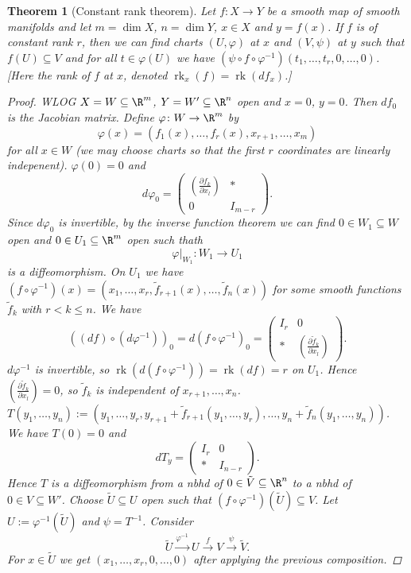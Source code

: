\documentclass[A4paper, british]{amsart}
\theoremstyle{darkgreentheorem}
\newtheorem{thm}{Theorem}[section]
\theoremstyle{darkbluedefinition}
\theoremstyle{darkredexample}
\theoremstyle{remark}
\DeclareMathOperator{\rk}{rk}
\newcommand{\1}{\mathbbm{1}}
\newcommand{\sub}{\subseteq}
\begin{document}
\begin{thm}[Constant rank theorem]
    Let $f\colon X\to Y$ be a smooth map of smooth manifolds and let $m=\dim{X}$, $n=\dim{Y}$, $x\in X$ and $y=f(x)$.
    If $f$ is of constant rank $r$, then we can find charts $(U,\varphi)$ at $x$ and $(V,\psi)$ at $y$ such that $f(U)\sub V$ and for all $t\in \varphi(U)$ we have $(\psi \circ f\circ \varphi^{-1})(t_{1},\ldots,t_{r},0,\ldots,0)$.
    [Here the rank of $f$ at $x$, denoted $\rk_{x}(f)=\rk(df_{x})$.]
    \begin{proof}
	WLOG $X=W\sub \R^{m}$, $Y=W'\sub \R^{n}$ open and $x=0$, $y=0$.
	Then $df_{0}$ is the Jacobian matrix.
	Define $\varphi \colon W\to \R^{m}$ by
	\[ \varphi(x)=(f_{1}(x),\ldots,f_{r}(x),x_{r+1},\ldots,x_{m}) \]
	for all $x\in W$ (we may choose charts so that the first $r$ coordinates are linearly indepenent).
	$\varphi(0)=0$ and
	\[ d\varphi_{0}=\begin{pmatrix} \left(\frac{\partial f_{k}}{\partial x_{l}}\right) & * \\ 0 & I_{m-r} \end{pmatrix}. \]
	    Since $d\varphi_{0}$ is invertible, by the inverse function theorem we can find $0\in W_{1}\sub W$ open and $0\in U_{1}\sub \R^{m}$ open such thath
	\[ \varphi|_{W_{1}}\colon W_{1}\to U_{1} \]
	is a diffeomorphism.
	On $U_{1}$ we have $(f\circ \varphi^{-1})(x)=(x_{1},\ldots,x_{r},\tilde{f}_{r+1}(x),\ldots,\tilde{f}_{n}(x))$ for some smooth functions $\tilde{f}_{k}$ with $r<k\leqslant n$.
	We have
	\[ ((df)\circ (d\varphi^{-1}))_{0}=d(f\circ \varphi^{-1})_{0}=\begin{pmatrix} I_{r} & 0 \\ * & \left( \frac{\partial \tilde{f}_{k}}{\partial x_{l}}\right) \end{pmatrix}.\]
	$d\varphi^{-1}$ is invertible, so $\rk(d(f\circ \varphi^{-1}))=\rk(df)=r$ on $U_{1}$.
	Hence $\left(\frac{\partial \tilde{f}_{k}}{\partial x_{l}}\right) = 0 $, so $\tilde{f}_{k}$ is independent of $x_{r+1},\ldots, x_{n}$.
	$T(y_{1},\ldots,y_{n}):=(y_{1},\ldots,y_{r}, y_{r+1}+\tilde{f}_{r+1}(y_{1},\ldots,y_{r}),\ldots,y_{n}+\tilde{f}_{n}(y_{1},\ldots,y_{n}))$.
	We have $T(0)=0$ and
	\[ dT_{y}=\begin{pmatrix} I_{r} & 0 \\ * & I_{n-r}\end{pmatrix}. \]
	Hence $T$ is a diffeomorphism from a nbhd of $0\in \tilde{V}\sub \R^{n}$ to a nbhd of $0\in V\sub W'$.
	Choose $\tilde{U}\sub U$ open such that $(f\circ \varphi^{-1})(\tilde{U})\sub V$.
	Let $U:=\varphi^{-1}(\tilde{U})$ and $\psi=T^{-1}$.
	Consider
	\[ \tilde{U}\xrightarrow{\varphi^{-1}}U\xrightarrow{f}V\xrightarrow{\psi}\tilde{V}. \]
	For $x\in \tilde{U}$ we get $(x_{1},\ldots,x_{r},0,\ldots,0)$ after applying the previous composition.
    \end{proof}
\end{thm}
\end{document}
